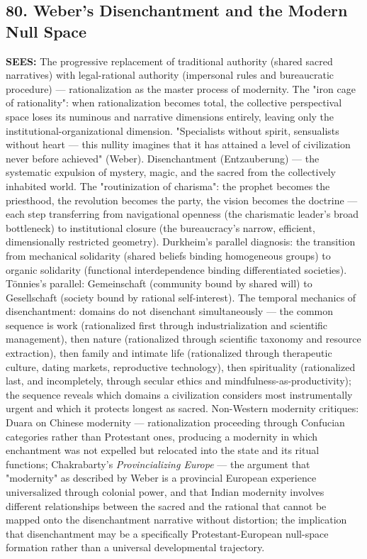 \bigskip\noindent\makebox[\textwidth]{\color{rulegray}\rule{5cm}{0.3pt}}\bigskip


\subsection*{80. Weber's Disenchantment and the Modern Null Space}


\textbf{SEES:} The progressive replacement of traditional authority (shared sacred narratives) with legal-rational authority (impersonal rules and bureaucratic procedure) — rationalization as the master process of modernity. The "iron cage of rationality": when rationalization becomes total, the collective perspectival space loses its numinous and narrative dimensions entirely, leaving only the institutional-organizational dimension. "Specialists without spirit, sensualists without heart — this nullity imagines that it has attained a level of civilization never before achieved" (Weber). Disenchantment (Entzauberung) — the systematic expulsion of mystery, magic, and the sacred from the collectively inhabited world. The "routinization of charisma": the prophet becomes the priesthood, the revolution becomes the party, the vision becomes the doctrine — each step transferring from navigational openness (the charismatic leader's broad bottleneck) to institutional closure (the bureaucracy's narrow, efficient, dimensionally restricted geometry). Durkheim's parallel diagnosis: the transition from mechanical solidarity (shared beliefs binding homogeneous groups) to organic solidarity (functional interdependence binding differentiated societies). Tönnies's parallel: Gemeinschaft (community bound by shared will) to Gesellschaft (society bound by rational self-interest). The temporal mechanics of disenchantment: domains do not disenchant simultaneously — the common sequence is work (rationalized first through industrialization and scientific management), then nature (rationalized through scientific taxonomy and resource extraction), then family and intimate life (rationalized through therapeutic culture, dating markets, reproductive technology), then spirituality (rationalized last, and incompletely, through secular ethics and mindfulness-as-productivity); the sequence reveals which domains a civilization considers most instrumentally urgent and which it protects longest as sacred. Non-Western modernity critiques: Duara on Chinese modernity — rationalization proceeding through Confucian categories rather than Protestant ones, producing a modernity in which enchantment was not expelled but relocated into the state and its ritual functions; Chakrabarty's \textit{Provincializing Europe} — the argument that "modernity" as described by Weber is a provincial European experience universalized through colonial power, and that Indian modernity involves different relationships between the sacred and the rational that cannot be mapped onto the disenchantment narrative without distortion; the implication that disenchantment may be a specifically Protestant-European null-space formation rather than a universal developmental trajectory.


